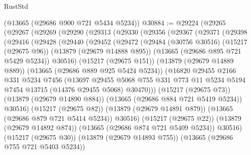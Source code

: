 \begin{lexlean}{RustStd}
\begin{coremodule}
    (@13665 (@29686 @900 @721 @5434 @5234))
@30884 := @29224
    (@29265
      (@29267
        (@29269
          (@29290
            (@29313
              (@29330
                (@29356
                  (@29367
                    (@29371
                      (@29398
                        (@29416
                          (@29428
                            (@29440
                              (@29452
                                (@29472
                                  (@29484
                                    (@30756 @30516)
                                    (@15217 (@29675 @96))
                                    (@13879 (@29679 @14888 @895))
                                    (@13665 (@29686 @895 @721 @5429 @5234))
                                    @30516)
                                  (@15217 (@29675 @151))
                                  (@13879 (@29679 @14889 @889))
                                  (@13665 (@29686 @889 @925 @5424 @5234))
                                  (@16820
                                    @29455
                                    @2166
                                    @331
                                    @5234
                                    @7456
                                    (@13697
                                      @29455
                                      @5068
                                      @755
                                      @331
                                      @773
                                      @11
                                      @5234
                                      @5194
                                      @7454
                                      @13715
                                      (@14376 @29455 @5068)
                                      @30470)))
                                (@15217 (@29675 @73))
                                (@13879 (@29679 @14890 @884))
                                (@13665 (@29686 @884 @721 @5419 @5234))
                                @30516)
                              (@15217 (@29675 @82))
                              (@13879 (@29679 @14891 @879))
                              (@13665 (@29686 @879 @721 @5414 @5234))
                              @30516)
                            (@15217 (@29675 @22))
                            (@13879 (@29679 @14892 @874))
                            (@13665 (@29686 @874 @721 @5409 @5234))
                            @30516)
                          (@15217 (@29675 @30))
                          (@13879 (@29679 @14893 @755))
                          (@13665 (@29686 @755 @721 @5403 @5234))

\end{coremodule}
\end{lexlean}
